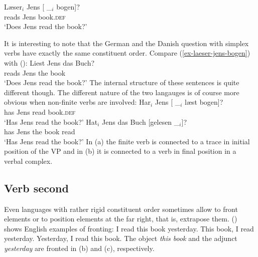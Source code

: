 \ex
\gll Læser$_i$ Jens [ \_$_i$ bogen]?\\
     reads     Jens {}        {}     book.\textsc{def}\\
\glt `Does Jens read the book?'
\zl

It is interesting to note that the German and the Danish question with simplex verbs have exactly
the same constituent order. Compare (\ref{ex-laeser-jens-bogen}) with ():
\ea
\gll Liest Jens das Buch?\\
     reads Jens the book\\ 
\glt `Does Jens read the book?'
\z
The internal structure of these sentences is quite different though. The different nature of the two
langauges is of course more obvious when non-finite verbs are involved:
\eal
\ex
\gll Har$_i$ Jens [ \_$_i$ læst bogen]?\\
     has Jens {} {} read book.\textsc{def}\\
\glt `Has Jens read the book?'
\ex
\gll Hat$_i$ Jens das Buch [gelesen \_$_i$]?\\
     has Jens the book \spacebr{}read\\ 
\glt `Has Jens read the book?'
\zl
In (a) the finite verb is connected to a trace in initial position of the VP and in
(b) it is connected to a verb in final position in a verbal complex.


\subsection{Verb second}

Even languages with rather rigid constituent order sometimes allow to front elements or to position
elements at the far right, that is, extrapose them. () shows English examples of fronting:
\eal
\ex I read this book yesterday.
\ex This book, I read yesterday.
\ex Yesterday, I read this book.
\zl
The object \emph{this book} and the adjunct \emph{yesterday} are fronted in (b) and
(c), respectively.

